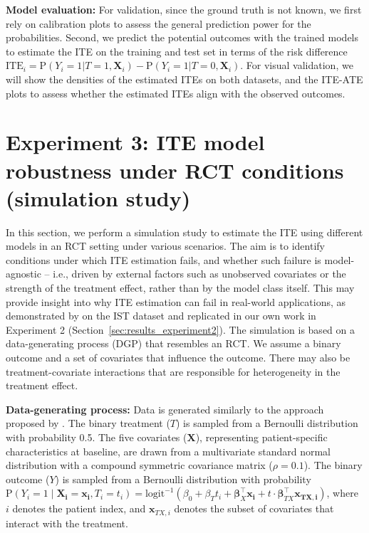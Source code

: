 \textbf{Model evaluation: } For validation, since the ground truth is not known, we first rely on calibration plots to assess the general prediction power for the probabilities. Second, we predict the potential outcomes with the trained models to estimate the ITE on the training and test set in terms of the risk difference $\text{ITE}_i = \text{P}(Y_i=1|T=1, \mathbf{X}_i) - \text{P}(Y_i=1|T=0, \mathbf{X}_i)$. For visual validation, we will show the densities of the estimated ITEs on both datasets, and the ITE-ATE plots to assess whether the estimated ITEs align with the observed outcomes.
















\section{Experiment 3: ITE model robustness under RCT conditions (simulation study)} \label{sec:methods_experiment3}

In this section, we perform a simulation study to estimate the ITE using different models in an RCT setting under various scenarios. The aim is to identify conditions under which ITE estimation fails, and whether such failure is model-agnostic -- i.e., driven by external factors such as unobserved covariates or the strength of the treatment effect, rather than by the model class itself. This may provide insight into why ITE estimation can fail in real-world applications, as demonstrated by \citet{chen2025} on the IST dataset and replicated in our own work in Experiment 2 (Section~\ref{sec:results_experiment2}). The simulation is based on a data-generating process (DGP) that resembles an RCT. We assume a binary outcome and a set of covariates that influence the outcome. There may also be treatment-covariate interactions that are responsible for heterogeneity in the treatment effect.


\textbf{Data-generating process:} Data is generated similarly to the approach proposed by \citet{hoogland2021}. The binary treatment ($T$) is sampled from a Bernoulli distribution with probability 0.5. The five covariates ($\mathbf{X}$), representing patient-specific characteristics at baseline, are drawn from a multivariate standard normal distribution with a compound symmetric covariance matrix ($\rho=0.1$). The binary outcome ($Y$) is sampled from a Bernoulli distribution with probability $\text{P}(Y_i = 1 \mid  \mathbf{X_i} = \mathbf{x_i}, T_i = t_i) = \text{logit}^{-1} \left(\beta_0 + \beta_T t_i + \boldsymbol{\beta}_X^\top \mathbf{x_i} + t \cdot \boldsymbol{\beta}_{TX}^\top \mathbf{x_{TX,i}} \right)$, where $i$ denotes the patient index, and $\mathbf{x}_{TX,i}$ denotes the subset of covariates that interact with the treatment.

